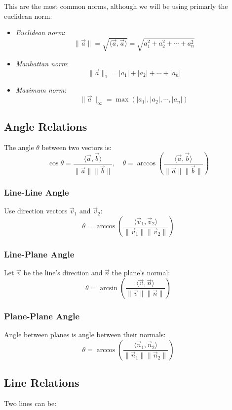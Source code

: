 This are the most common norms, although we will be using primarly the euclidean norm:

\begin{itemize}[label=\(-\)]
	\item \emph{Euclidean norm}:
	      \[
		      \|\vec{a}\| = \sqrt{\langle\vec{a}, \vec{a}\rangle} = \sqrt{a_1^2 + a_2^2 + \cdots + a_n^2}
	      \]
	\item \emph{Manhattan norm}:
	      \[
		      \|\vec{a}\|_1 = |a_1| + |a_2| + \cdots + |a_n|
	      \]
	\item \emph{Maximum norm}:
	      \[
		      \|\vec{a}\|_\infty = \max(|a_1|, |a_2|, \cdots , |a_n|)
	      \]
\end{itemize}

\subsection{Angle Relations}
The angle \(\theta\) between two vectors is:
\[
	\cos\theta = \frac{\langle\vec{a}, \vec{b}\rangle}{\|\vec{a}\|\|\vec{b}\|}, \quad \theta = \arccos\left( \frac{\langle\vec{a}, \vec{b}\rangle}{\|\vec{a}\|\|\vec{b}\|} \right)
\]

\subsubsection*{Line-Line Angle}

Use direction vectors \(\vec{v}_1\) and \(\vec{v}_2\):
\[
	\theta = \arccos\left( \frac{\langle\vec{v}_1, \vec{v}_2\rangle}{\|\vec{v}_1\|\|\vec{v}_2\|} \right)
\]

\subsubsection*{Line-Plane Angle}

Let \(\vec{v}\) be the line's direction and \(\vec{n}\) the plane's normal:
\[
	\theta = \arcsin\left( \frac{\langle\vec{v}, \vec{n}\rangle}{\|\vec{v}\|\|\vec{n}\|} \right)
\]

\subsubsection*{Plane-Plane Angle}

Angle between planes is angle between their normals:
\[
	\theta = \arccos\left( \frac{\langle\vec{n}_1, \vec{n}_2\rangle}{\|\vec{n}_1\|\|\vec{n}_2\|} \right)
\]

\subsection{Line Relations}
Two lines can be:

